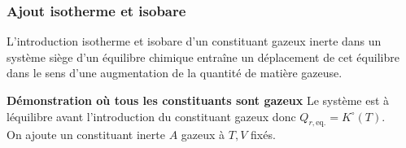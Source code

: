\documentclass{article}
\newcommand{\equi}{\text{eq.}}
\begin{document}
\subsubsection{Ajout isotherme et isobare}
\begin{enonce}
    L’introduction isotherme et isobare d’un constituant gazeux inerte dans un système siège d’un équilibre chimique entraîne un déplacement de cet équilibre dans le sens d’une augmentation de la quantité de matière gazeuse.
\end{enonce}
\begin{tableau}
    \textbf{Démonstration où tous les constituants sont gazeux}
    Le système est à léquilibre avant l'introduction du constituant gazeux donc $Q_{r,\equi} = K^\circ(T)$.\\
    
    On ajoute un constituant inerte $A$ gazeux à $T,V$ fixés.\\
    

\end{tableau}
\end{document}
